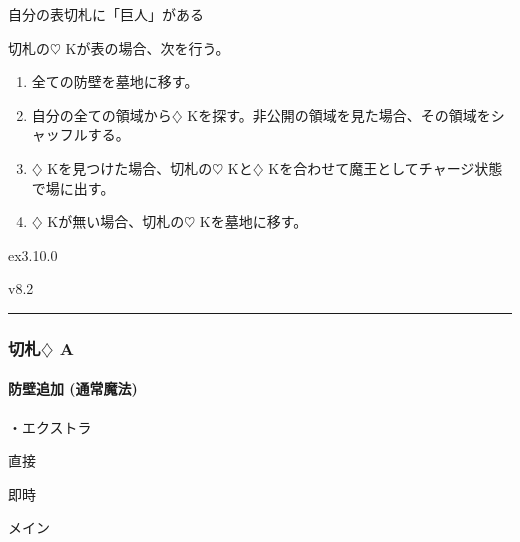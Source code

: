 \documentclass[letterpaper,10pt,dvipdfmx]{sphinxmanual}
\begin{document}
\sphinxAtStartPar
自分の表切札に「巨人」がある

\sphinxAtStartPar
{}

\sphinxAtStartPar
切札の{\normalsize $\heartsuit$} Kが表の場合、次を行う。
\begin{enumerate}
%
\item {} 
\sphinxAtStartPar
全ての防壁を墓地に移す。

\item {} 
\sphinxAtStartPar
自分の全ての領域から{\normalsize $\diamondsuit$} Kを探す。非公開の領域を見た場合、その領域をシャッフルする。

\item {} 
\sphinxAtStartPar
{\normalsize $\diamondsuit$} Kを見つけた場合、切札の{\normalsize $\heartsuit$} Kと{\normalsize $\diamondsuit$} Kを合わせて魔王としてチャージ状態で場に出す。

\item {} 
\sphinxAtStartPar
{\normalsize $\diamondsuit$} Kが無い場合、切札の{\normalsize $\heartsuit$} Kを墓地に移す。

\end{enumerate}

\sphinxAtStartPar
{}  ex3.10.0

\sphinxAtStartPar
{}  v8.2


\bigskip\hrule\bigskip



\subsubsection{切札{\normalsize $\diamondsuit$} A}
\label{\detokenize{auto/frameActionlist:id54}}

\paragraph{防壁追加 (通常魔法)}
\label{\detokenize{auto/frameActionlist:act-addbulwark}}\label{\detokenize{auto/frameActionlist:id55}}
\sphinxAtStartPar
{}

\sphinxAtStartPar
・エクストラ

\sphinxAtStartPar
{} 直接

\sphinxAtStartPar
{} 即時

\sphinxAtStartPar
{} メイン
\end{document}
